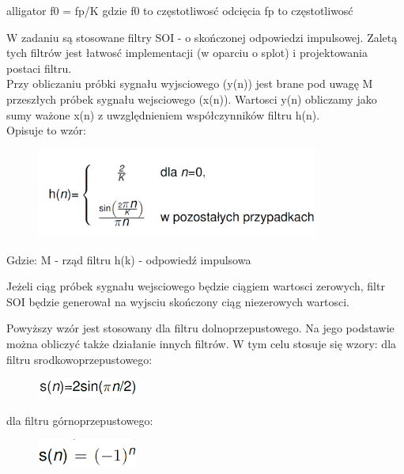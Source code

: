 \documentclass[12pt]{article}
\begin{document}
\begin{labeling}{alligator}
\subsubitem f0 = fp/K gdzie f0 to częstotliwosć odcięcia
\subsubitem fp to częstotliwosć 

W zadaniu są stosowane filtry SOI - o skończonej odpowiedzi impulsowej. Zaletą tych filtrów jest łatwosć implementacji (w oparciu o splot) i projektowania postaci filtru. 
\\Przy obliczaniu próbki sygnału wyjsciowego (y(n)) jest brane pod uwagę M przeszłych próbek sygnału wejsciowego (x(n)). Wartosci y(n) obliczamy jako sumy ważone x(n) z uwzględnieniem współczynników filtru h(n). 
\\Opisuje to wzór:

\begin{figure}[h!]
 \centering
 \includegraphics[width=9.3cm]{filtrS.PNG}
 \vspace{-0.3cm}
 \label{filtrS}
\end{figure}

Gdzie:
\subitem M - rząd filtru 
\subitem h(k) - odpowiedź impulsowa

Jeżeli ciąg próbek sygnału wejsciowego będzie ciągiem wartosci zerowych,  filtr SOI będzie generował na wyjsciu skończony ciąg niezerowych wartosci.

Powyższy wzór jest stosowany dla filtru dolnoprzepustowego. Na jego podstawie można obliczyć także działanie innych filtrów. W tym celu stosuje się wzory:
\subsubitem dla filtru srodkowoprzepustowego:
\begin{figure}[h!]
 \centering
 \includegraphics[width=3.3cm]{sr.PNG}
 \vspace{-0.3cm}
 \label{Splot_indeks}
\end{figure}

\subsubitem dla filtru górnoprzepustowego:
\begin{figure}[h!]
 \centering
 \includegraphics[width=3.3cm]{gor.PNG}
 \vspace{-0.3cm}
 \label{Splot_indeks}
\end{figure}



\end{labeling}
\end{document}
